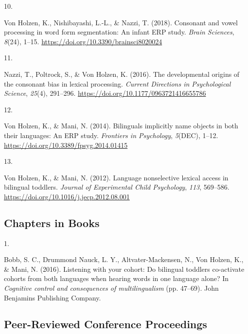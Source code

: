 \documentclass[10pt,a4paper,]{article}
\newlength{\cslhangindent}
\newlength{\csllabelwidth}
\newcommand{\CSLLeftMargin}[1]{\parbox[t]{\csllabelwidth}{\hfill #1~}}
\newcommand{\CSLRightInline}[1]{\parbox[t]{\linewidth - \cslhangindent - \csllabelwidth}{#1}\vspace{0.8ex}}
\begin{document}
\leavevmode{}%
\CSLLeftMargin{10. }%
\CSLRightInline{Von Holzen, K., Nishibayashi, L.-L., \& Nazzi, T.
(2018). Consonant and vowel processing in word form segmentation: An
infant ERP study. \emph{Brain Sciences}, \emph{8}(24), 1--15.
\url{https://doi.org/10.3390/brainsci8020024}}

\leavevmode{}%
\CSLLeftMargin{11. }%
\CSLRightInline{Nazzi, T., Poltrock, S., \& Von Holzen, K. (2016). The
developmental origins of the consonant bias in lexical processing.
\emph{Current Directions in Psychological Science}, \emph{25}(4),
291--296. \url{https://doi.org/10.1177/0963721416655786}}

\leavevmode{}%
\CSLLeftMargin{12. }%
\CSLRightInline{Von Holzen, K., \& Mani, N. (2014). Bilinguals
implicitly name objects in both their languages: An ERP study.
\emph{Frontiers in Psychology}, \emph{5}(DEC), 1--12.
\url{https://doi.org/10.3389/fpsyg.2014.01415}}

\leavevmode{}%
\CSLLeftMargin{13. }%
\CSLRightInline{Von Holzen, K., \& Mani, N. (2012). Language
nonselective lexical access in bilingual toddlers. \emph{Journal of
Experimental Child Psychology}, \emph{113}, 569--586.
\url{https://doi.org/10.1016/j.jecp.2012.08.001}}

\hypertarget{chapters-in-books}{%
\subsection{Chapters in Books}\label{chapters-in-books}}

\hypertarget{bibliography}{}
\leavevmode{}%
\CSLLeftMargin{1. }%
\CSLRightInline{Bobb, S. C., Drummond Nauck, L. Y., Altvater-Mackensen,
N., Von Holzen, K., \& Mani, N. (2016). Listening with your cohort: Do
bilingual toddlers co-activate cohorts from both languages when hearing
words in one language alone? In \emph{Cognitive control and consequences
of multilingualism} (pp. 47--69). John Benjamins Publishing Company.}

\hypertarget{peer-reviewed-conference-proceedings}{%
\subsection{Peer-Reviewed Conference
Proceedings}\label{peer-reviewed-conference-proceedings}}
\end{document}
